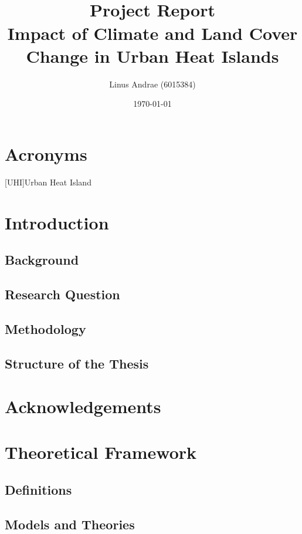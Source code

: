 \documentclass[a4paper, english]{article}
\title{\textit{} \\ \vspace{1cm}Project Report \\ \vspace{1cm} \textbf{\huge Impact of Climate and Land Cover Change in Urban Heat Islands}\\ \vspace{1.2cm} }
\author{Linus Andrae (6015384)}
\date{\today}
\begin{document}
  
  \newpage

  
  \newpage

  \tableofcontents
  \listoffigures
  \listoftables

  \section*{Acronyms}
  \begin{acronym}
    [UHI]{Urban Heat Island}
  \end{acronym}
\newpage

\section{Introduction}
    \subsection{Background}
   
    \subsection{Research Question}
    \subsection{Methodology}
    \subsection{Structure of the Thesis}

\section*{Acknowledgements}

\section{Theoretical Framework}
    \subsection{Definitions}
    
    \subsection{Models and Theories}
\end{document}
